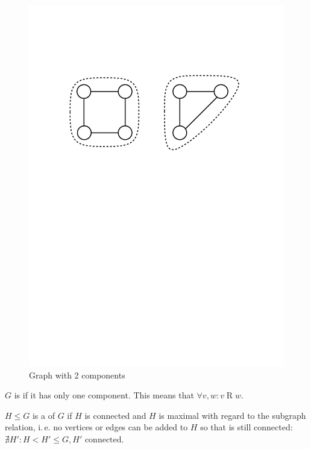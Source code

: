 \begin{figure}[htb]
	\centering
	\includegraphics[scale=.5]{01_graph_theory/pics/components.pdf}
	\caption{Graph with 2 components}
\end{figure}
\FloatBarrier

\begin{definition}
$G$ is  if it has only one component. This means that $\forall v,w: v\operatorname{R} w$.
\end{definition}

\begin{definition}
$H\leq G$ is a  of $G$ if $H$ is connected and $H$
is maximal with regard to the subgraph relation, i.\,e. no vertices or edges can
be added to $H$ so that is still connected: $\nexists H': H < H' \leq G, H'\text{ connected}.$
\end{definition}

